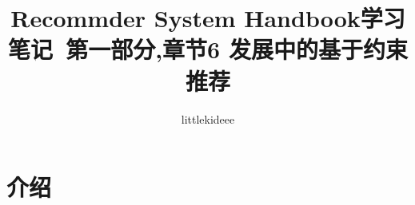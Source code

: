 \documentclass{article}
\begin{document}
 \title{Recommder System Handbook学习笔记\ 第一部分,章节6 发展中的基于约束推荐}
 \author{littlekideee}
 \maketitle

 \section{介绍}
 
\end{document}

